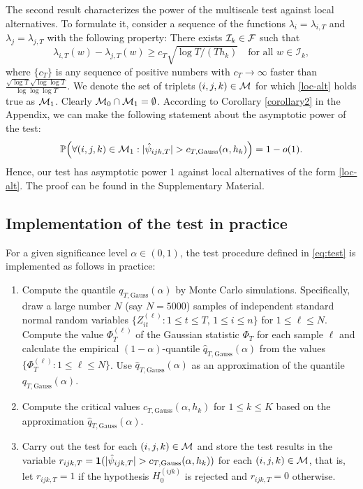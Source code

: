 \documentclass[a4paper,12pt]{article}
\numberwithin{equation}{section}
\begin{document}
The second result characterizes the power of the multiscale test against local alternatives. To formulate it, consider a sequence of the functions $\lambda_{i}= \lambda_{i, T}$ and $\lambda_j =\lambda_{j, T}$ with the following property: There exists $\mathcal{I}_{k} \in \mathcal{F}$ such that 
\begin{equation}\label{loc-alt}
\lambda_{i, T}(w) - \lambda_{j, T}(w) \ge c_T \sqrt{\log T / (T h_{k})} \quad \text{for all } w \in \mathcal{I}_{k}, 
\end{equation}
where $\{c_T\}$ is any sequence of positive numbers with $c_T \rightarrow \infty$ faster than $\frac{\sqrt{\log T}\sqrt{\log \log T}}{\log \log \log T}$. We denote the set of triplets $(i, j, k) \in \mathcal{M}$ for which \eqref{loc-alt} holds true as $\mathcal{M}_1$. Clearly $\mathcal{M}_0 \cap \mathcal{M}_1 = \emptyset$. According to Corollary \ref{corollary2} in the Appendix, we can make the following statement about the asymptotic power of the test:
\begin{equation}\label{eq:power}
\mathbb{P}\Big( \forall (i,j,k) \in \mathcal{M}_1: |\hat{\psi}_{ijk,T}| > c_{T,\textnormal{Gauss}}(\alpha,h_k) \Big) = 1 - o(1).
\end{equation}
Hence, our test has asymptotic power $1$ against local alternatives of the form \eqref{loc-alt}. The proof can be found in the Supplementary Material.

\subsection{Implementation of the test in practice}


For a given significance level $\alpha \in (0,1)$, the test procedure defined in \eqref{eq:test} is implemented as follows in practice: 
\begin{enumerate}[label=\textit{Step \arabic*.}, leftmargin=1.45cm]
\item Compute the quantile $q_{T,\text{Gauss}}(\alpha)$ by Monte Carlo simulations. Specifically, draw a large number $N$ (say $N=5000$) samples of independent standard normal random variables $\{Z_{it}^{(\ell)} : 1 \le t \le T, \, 1 \le i \le n \}$ for $1 \le \ell \le N$. Compute the value $\Phi_T^{(\ell)}$ of the Gaussian statistic $\Phi_T$ for each sample $\ell$ and calculate the empirical $(1-\alpha)$-quantile $\hat{q}_{T,\text{Gauss}}(\alpha)$ from the values $\{ \Phi_T^{(\ell)}: 1 \le \ell \le N \}$. Use $\hat{q}_{T,\text{Gauss}}(\alpha)$ as an approximation of the quantile $q_{T,\text{Gauss}}(\alpha)$. 
\item Compute the critical values $c_{T,\text{Gauss}}(\alpha,h_k)$ for $1 \le k \le K$ based on the approximation $\hat{q}_{T,\text{Gauss}}(\alpha)$.
\item Carry out the test for each $(i,j,k) \in \mathcal{M}$ and store the test results in the variable $r_{ijk,T} = \boldsymbol{1}( |\hat{\psi}_{ijk,T}| > c_{T,\text{Gauss}}(\alpha,h_k))$ for each $(i,j,k) \in \mathcal{M}$, that is, let $r_{ijk,T} = 1$ if the hypothesis $H_0^{(ijk)}$ is rejected and $r_{ijk,T} = 0$ otherwise. 
\end{enumerate}
\end{document}
